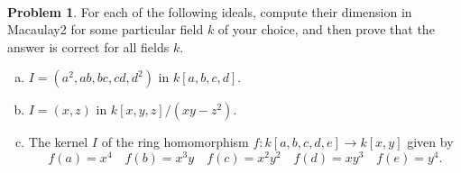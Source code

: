 \documentclass[11pt]{article}
\DeclareMathOperator{\height}{height}
\theoremstyle{definition}
\newtheorem{problem}{Problem}
\begin{document}
%
%
%		
%		
%		

\

\begin{problem}
	For each of the following ideals, compute their dimension in Macaulay2 for some particular field $k$ of your choice, and then prove that the answer is correct for all fields $k$.

\begin{enumerate}[a)]
\item $I = (a^2,ab,bc,cd,d^2)$ in $k[a,b,c,d]$.
\item $I = (x,z)$ in $k[x,y,z]/(xy-z^2)$.
\item The kernel $I$ of the ring homomorphism $f\!: k[a,b,c,d,e] \to k[x,y]$ given by
$$f(a) = x^4 \quad f(b) = x^3y \quad f(c) = x^2y^2 \quad f(d) = xy^3 \quad f(e) = y^4.$$
\end{enumerate}

\end{problem}
\end{document}

